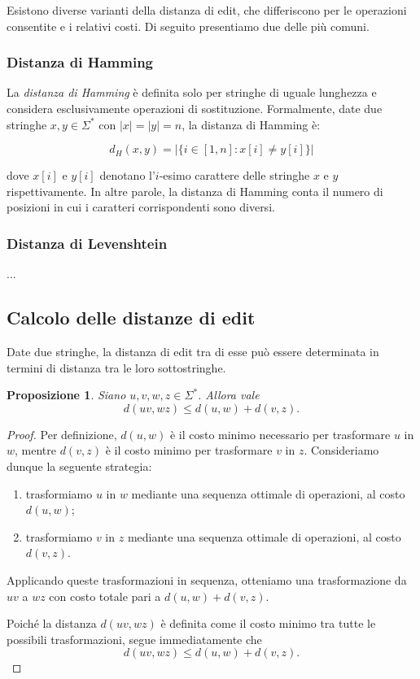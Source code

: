 \documentclass[a4paper,12pt]{report}
\newtheorem{proposizione}{Proposizione}[chapter]
\begin{document}
    Esistono diverse varianti della distanza di edit, che differiscono per le operazioni consentite e i relativi costi. Di seguito presentiamo due delle più comuni.
    
    \subsubsection{Distanza di Hamming}
    
    La \textit{distanza di Hamming} è definita solo per stringhe di uguale lunghezza e considera esclusivamente operazioni di sostituzione. Formalmente, date due stringhe $x, y \in \Sigma^*$ con $|x| = |y| = n$, la distanza di Hamming è:
    
    $$d_H(x, y) = |\{i \in [1, n] : x[i] \neq y[i]\}|$$
    
    dove $x[i]$ e $y[i]$ denotano l'$i$-esimo carattere delle stringhe $x$ e $y$ rispettivamente. In altre parole, la distanza di Hamming conta il numero di posizioni in cui i caratteri corrispondenti sono diversi.
    
    \subsubsection{Distanza di Levenshtein}
    
        ...

    \subsection{Calcolo delle distanze di edit}

    Date due stringhe, la distanza di edit tra di esse può essere determinata in termini di distanza tra le loro sottostringhe.

    \begin{proposizione}
        Siano $u,v,w,z \in \Sigma^*$. Allora vale
        \[
            d(uv, wz) \leq d(u,w) + d(v,z).
        \]
    \end{proposizione}

    \begin{proof}
        Per definizione, $d(u,w)$ è il costo minimo necessario per trasformare $u$ in $w$, mentre $d(v,z)$ è il costo minimo per trasformare $v$ in $z$.
        Consideriamo dunque la seguente strategia:
        \begin{enumerate}
            \item trasformiamo $u$ in $w$ mediante una sequenza ottimale di operazioni, al costo $d(u,w)$;
            \item trasformiamo $v$ in $z$ mediante una sequenza ottimale di operazioni, al costo $d(v,z)$.
        \end{enumerate}
        Applicando queste trasformazioni in sequenza, otteniamo una trasformazione da $uv$ a $wz$ con costo totale pari a $d(u,w)+d(v,z)$.

        Poiché la distanza $d(uv,wz)$ è definita come il costo minimo tra tutte le possibili trasformazioni, segue immediatamente che
        \[
            d(uv, wz) \leq d(u,w) + d(v,z).
        \]
    \end{proof}
\end{document}
